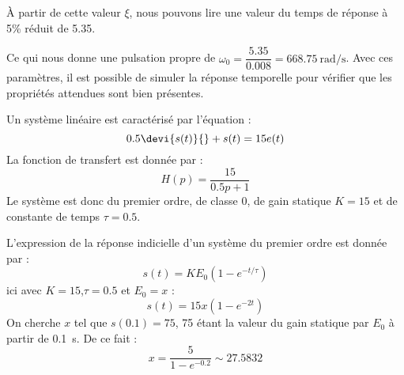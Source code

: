 À partir de cette valeur $\xi$, nous pouvons lire une valeur du temps de réponse
à 5\% réduit de 5.35.
\begin{center}

\end{center}
Ce qui nous donne une pulsation propre de 
$\omega_0=\dfrac{5.35}{0.008}=\SI{668.75}{\radian\per\second}$.
Avec ces paramètres, il est possible de simuler la réponse temporelle pour 
vérifier que les propriétés attendues sont bien présentes.
\begin{center}
    
\end{center}
\clearpage
Un système linéaire est caractérisé par l'équation :
\[
    0.5\devi{s(t)}{}+s(t)=15e(t)
\]
La fonction de transfert est donnée par :
\[
    H(p)=\dfrac{15}{0.5p+1}
\]
Le système est donc du premier ordre, de classe 0, de gain statique $K=15$ et 
de constante de temps $\tau=0.5$.

L'expression de la réponse indicielle d'un système du premier ordre est donnée
par :
\[
    s(t)=KE_0\left(1-e^{-t/\tau}\right)
\]
ici avec $K=15$,$\tau=0.5$ et $E_0=x$ :
\[
    s(t)=15x\left(1-e^{-2t}\right)
\]
On cherche $x$ tel que $s(0.1)=75$, 75 étant la valeur du gain statique par $E_0$ à partir de \SI{0.1}{\second}.
De ce fait :
\[
    x=\dfrac{5}{1-e^{-0.2}}\sim27.5832
\]


